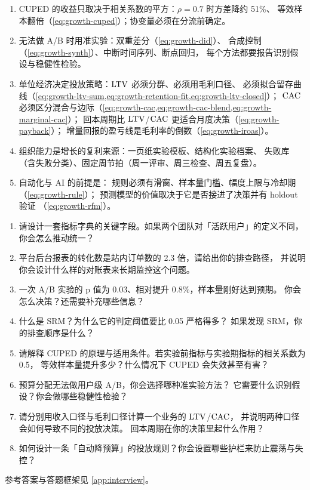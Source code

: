 \begin{keypoint}[本章要点回顾]
\begin{enumerate}
  \item CUPED 的收益只取决于相关系数的平方：$\rho = 0.7$ 时方差降约 51\%、
        等效样本翻倍（\cref{eq:growth-cuped}）；协变量必须在分流前确定。
  \item 无法做 A/B 时用准实验：双重差分（\cref{eq:growth-did}）、
        合成控制（\cref{eq:growth-synth}）、中断时间序列、断点回归，
        每个方法都要报告识别假设与稳健性检验。
  \item 单位经济决定投放策略：$\operatorname{LTV}$ 必须分群、必须用毛利口径、
        必须拟合留存曲线（\cref{eq:growth-ltv-sum,eq:growth-retention-fit,eq:growth-ltv-closed}）；
        $\operatorname{CAC}$ 必须区分混合与边际（\cref{eq:growth-cac,eq:growth-cac-blend,eq:growth-marginal-cac}）；
        回本周期比 $\operatorname{LTV}$/$\operatorname{CAC}$ 更适合月度决策（\cref{eq:growth-payback}）；
        增量回报的盈亏线是毛利率的倒数（\cref{eq:growth-iroas}）。
  \item 组织能力是增长的复利来源：一页纸实验模板、结构化实验档案、
        失败库（含失败分类）、固定周节拍（周一评审、周三检查、周五复盘）。
  \item 自动化与 AI 的前提是：
        规则必须有滑窗、样本量门槛、幅度上限与冷却期（\cref{eq:growth-rule}）；
        预测模型的价值取决于它是否接进了决策并有 holdout 验证
        （\cref{eq:growth-rfm}）。
\end{enumerate}
\end{keypoint}

\begin{interview}[本章对应的面试题]
\begin{enumerate}
  \item 请设计一套指标字典的关键字段。如果两个团队对「活跃用户」的定义不同，
        你会怎么推动统一？
  \item 平台后台报表的转化数是站内订单数的 2.3 倍，请给出你的排查路径，
        并说明你会设计什么样的对账表来长期监控这个问题。
  \item 一次 A/B 实验的 p 值为 0.03、相对提升 0.8\%，样本量刚好达到预期。
        你会怎么决策？还需要补充哪些信息？
  \item 什么是 SRM？为什么它的判定阈值要比 0.05 严格得多？
        如果发现 SRM，你的排查顺序是什么？
  \item 请解释 CUPED 的原理与适用条件。若实验前指标与实验期指标的相关系数为 0.5，
        等效样本量提升多少？什么情况下 CUPED 会失效甚至有害？
  \item 预算分配无法做用户级 A/B，你会选择哪种准实验方法？
        它需要什么识别假设？你会做哪些稳健性检验？
  \item 请分别用收入口径与毛利口径计算一个业务的 $\operatorname{LTV}$/$\operatorname{CAC}$，
        并说明两种口径会如何导致不同的投放决策。
        回本周期在你的决策里起什么作用？
  \item 如何设计一条「自动降预算」的投放规则？你会设置哪些护栏来防止震荡与失控？
\end{enumerate}
参考答案与答题框架见 \cref{app:interview}。
\end{interview}

